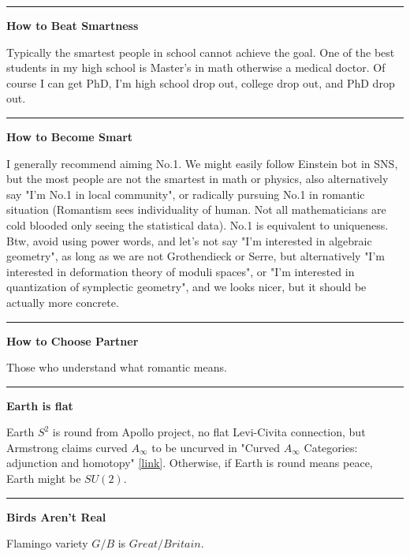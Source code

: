 \documentclass{article}
\begin{document}
\noindent\rule{\textwidth}{0.4pt}

\noindent
\textbf{How to Beat Smartness}

\noindent
Typically the smartest people in school cannot achieve the goal. 
One of the best students in my high school is Master's in math otherwise a medical doctor.
Of course I can get PhD, I'm high school drop out, college drop out, and PhD drop out. \\



\noindent\rule{\textwidth}{0.4pt}

\noindent
\textbf{How to Become Smart}

\noindent
I generally recommend aiming No.1. We might easily follow Einstein bot in SNS, but the most people are not the smartest in math or physics,
also alternatively say "I'm No.1 in local community", or radically pursuing No.1 in romantic situation (Romantism sees individuality of human. 
Not all mathematicians are cold blooded only seeing the statistical data). No.1 is equivalent to uniqueness.
Btw, avoid using power words, and let's not say "I'm interested in algebraic geometry", as long as we are not Grothendieck or Serre,
but alternatively "I'm interested in deformation theory of moduli spaces", or "I'm interested in quantization of symplectic geometry",
and we looks nicer, but it should be actually more concrete.  \\


\noindent\rule{\textwidth}{0.4pt}

\noindent
\textbf{How to Choose Partner}

\noindent
Those who understand what romantic means. \\


\noindent\rule{\textwidth}{0.4pt}

\noindent
\textbf{Earth is flat}

\noindent
Earth $S^2$ is round from Apollo project, no flat Levi-Civita connection, 
but Armstrong claims curved $A_\infty$ to be uncurved in "Curved $A_\infty$ Categories: adjunction and homotopy"
\href{https://arxiv.org/pdf/1506.03711}{[link]}.
Otherwise, if Earth is round means peace, Earth might be $SU(2)$.


\noindent\rule{\textwidth}{0.4pt}

\noindent
\textbf{Birds Aren't Real}

\noindent
Flamingo variety $G/B$ is $Great/Britain$.  \\
\end{document}
